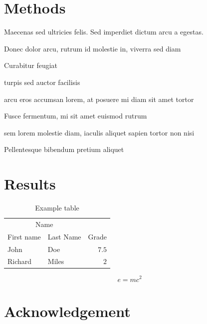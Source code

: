 \documentclass[twocolumn]{article}
\begin{document}
\section{Methods}

Maecenas sed ultricies felis. Sed imperdiet dictum arcu a egestas. 
\begin{compactitem}
\item Donec dolor arcu, rutrum id molestie in, viverra sed diam
\item Curabitur feugiat
\item turpis sed auctor facilisis
\item arcu eros accumsan lorem, at posuere mi diam sit amet tortor
\item Fusce fermentum, mi sit amet euismod rutrum
\item sem lorem molestie diam, iaculis aliquet sapien tortor non nisi
\item Pellentesque bibendum pretium aliquet
\end{compactitem}
\lipsum[4] %


\section{Results}

\begin{table}[H]
\caption{Example table}
\centering
\begin{tabular}{llr}
\toprule
\multicolumn{2}{c}{Name} \\
\cmidrule(r){1-2}
First name & Last Name & Grade \\
\midrule
John & Doe & $7.5$ \\
Richard & Miles & $2$ \\
\bottomrule
\end{tabular}
\end{table}

\lipsum[5] %

\begin{equation}
\label{eq:emc}
e = mc^2
\end{equation}

\lipsum[6] %


\section*{Acknowledgement} %
\label{sec:acknowledgement}
\end{document}

